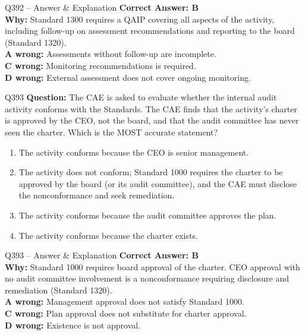 \documentclass[aspectratio=169,10pt]{beamer}
\begin{document}
	\begin{frame}[t]{Q392 -- Answer \& Explanation}
		\small
		\textbf{Correct Answer: B} \\[4pt]
		\textbf{Why:} Standard 1300 requires a QAIP covering all aspects of the activity, including follow-up on assessment recommendations and reporting to the board (Standard 1320). \\[4pt]
		\textbf{A wrong:} Assessments without follow-up are incomplete. \\[2pt]
		\textbf{C wrong:} Monitoring recommendations is required. \\[2pt]
		\textbf{D wrong:} External assessment does not cover ongoing monitoring.
	\end{frame}
	
	\begin{frame}[t]{Q393}
		\small
		\textbf{Question:} The CAE is asked to evaluate whether the internal audit activity conforms with the Standards. The CAE finds that the activity's charter is approved by the CEO, not the board, and that the audit committee has never seen the charter. Which is the MOST accurate statement?
		\begin{enumerate}[label=\Alph*.,itemsep=1pt,topsep=2pt]
			\item The activity conforms because the CEO is senior management.
			\item The activity does not conform; Standard 1000 requires the charter to be approved by the board (or its audit committee), and the CAE must disclose the nonconformance and seek remediation.
			\item The activity conforms because the audit committee approves the plan.
			\item The activity conforms because the charter exists.
		\end{enumerate}
	\end{frame}
	
	\begin{frame}[t]{Q393 -- Answer \& Explanation}
		\small
		\textbf{Correct Answer: B} \\[4pt]
		\textbf{Why:} Standard 1000 requires board approval of the charter. CEO approval with no audit committee involvement is a nonconformance requiring disclosure and remediation (Standard 1320). \\[4pt]
		\textbf{A wrong:} Management approval does not satisfy Standard 1000. \\[2pt]
		\textbf{C wrong:} Plan approval does not substitute for charter approval. \\[2pt]
		\textbf{D wrong:} Existence is not approval.
	\end{frame}
	
\end{document}
